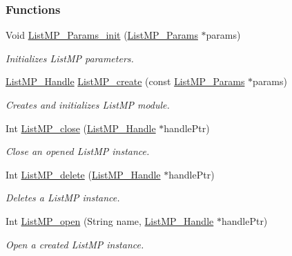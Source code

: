 \subsubsection*{Functions}
\begin{DoxyCompactItemize}
\item 
Void \hyperlink{_list_m_p_8h_a051127fdcd75440808d0fed31c6e8b4b}{ListMP\_\-Params\_\-init} (\hyperlink{struct_list_m_p___params}{ListMP\_\-Params} $\ast$params)
\begin{DoxyCompactList}\small\item\em Initializes ListMP parameters. \item\end{DoxyCompactList}\item 
\hyperlink{_list_m_p_8h_abf5a0381ce9dab133382015abaf7fe6b}{ListMP\_\-Handle} \hyperlink{_list_m_p_8h_a71fdd7f30d377065fb70dd095a186d3e}{ListMP\_\-create} (const \hyperlink{struct_list_m_p___params}{ListMP\_\-Params} $\ast$params)
\begin{DoxyCompactList}\small\item\em Creates and initializes ListMP module. \item\end{DoxyCompactList}\item 
Int \hyperlink{_list_m_p_8h_a9f9045344d095a9829ba601d74d39c93}{ListMP\_\-close} (\hyperlink{_list_m_p_8h_abf5a0381ce9dab133382015abaf7fe6b}{ListMP\_\-Handle} $\ast$handlePtr)
\begin{DoxyCompactList}\small\item\em Close an opened ListMP instance. \item\end{DoxyCompactList}\item 
Int \hyperlink{_list_m_p_8h_a9a3875bf334cbc6d692e9053e7e4152b}{ListMP\_\-delete} (\hyperlink{_list_m_p_8h_abf5a0381ce9dab133382015abaf7fe6b}{ListMP\_\-Handle} $\ast$handlePtr)
\begin{DoxyCompactList}\small\item\em Deletes a ListMP instance. \item\end{DoxyCompactList}\item 
Int \hyperlink{_list_m_p_8h_aeae2eea832b0f2f8cf45ea297bb1c7d0}{ListMP\_\-open} (String name, \hyperlink{_list_m_p_8h_abf5a0381ce9dab133382015abaf7fe6b}{ListMP\_\-Handle} $\ast$handlePtr)
\begin{DoxyCompactList}\small\item\em Open a created ListMP instance. \item\end{DoxyCompactList}\item 

\end{DoxyCompactItemize}
